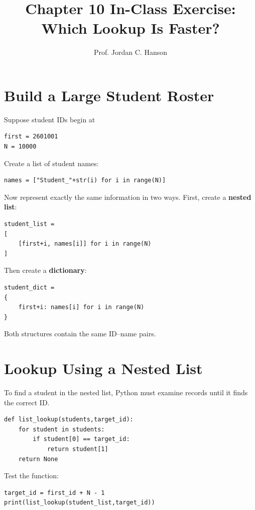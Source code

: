 \documentclass{article}
\begin{document}
\twocolumn

\title{Chapter 10 In-Class Exercise: Which Lookup Is Faster?}
\author{Prof. Jordan C. Hanson}
\date{}

\maketitle

\section{Build a Large Student Roster}

Suppose student IDs begin at

\begin{verbatim}
first = 2601001
N = 10000
\end{verbatim}
\noindent
Create a list of student names:

\begin{verbatim}
names = ["Student_"+str(i) for i in range(N)]
\end{verbatim}
\noindent
Now represent exactly the same information in two ways.  First, create a \textbf{nested list}:
\begin{verbatim}
student_list = 
[
    [first+i, names[i]] for i in range(N)
]
\end{verbatim}
\noindent
Then create a \textbf{dictionary}:
\begin{verbatim}
student_dict = 
{
    first+i: names[i] for i in range(N)
}
\end{verbatim}
\noindent
Both structures contain the same ID--name pairs.

\section{Lookup Using a Nested List}

To find a student in the nested list, Python must examine records until it finds the correct ID.

\begin{verbatim}
def list_lookup(students,target_id):
    for student in students:
        if student[0] == target_id:
            return student[1]
    return None
\end{verbatim}
\noindent
Test the function:

\begin{verbatim}
target_id = first_id + N - 1
print(list_lookup(student_list,target_id))
\end{verbatim}
\end{document}
